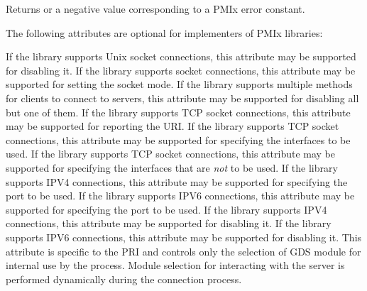 \begin{arglist}
\end{arglist}

Returns  or a negative value corresponding to a \ac{PMIx} error constant.

\optattrstart
The following attributes are optional for implementers of \ac{PMIx} libraries:

 If the library supports Unix socket connections, this attribute may be supported for disabling it.
\pasteAttributeItemEnd{}
 If the library supports socket connections, this attribute may be supported for setting the socket mode.
\pasteAttributeItemEnd{}
 If the library supports multiple methods for clients to connect to servers, this attribute may be supported for disabling all but one of them.
\pasteAttributeItemEnd{}
 If the library supports TCP socket connections, this attribute may be supported for reporting the URI.
\pasteAttributeItemEnd{}
 If the library supports TCP socket connections, this attribute may be supported for specifying the interfaces to be used.
\pasteAttributeItemEnd{}
 If the library supports TCP socket connections, this attribute may be supported for specifying the interfaces that are \textit{not} to be used.
\pasteAttributeItemEnd{}
 If the library supports IPV4 connections, this attribute may be supported for specifying the port to be used.
\pasteAttributeItemEnd{}
 If the library supports IPV6 connections, this attribute may be supported for specifying the port to be used.
\pasteAttributeItemEnd{}
 If the library supports IPV4 connections, this attribute may be supported for disabling it.
\pasteAttributeItemEnd{}
 If the library supports IPV6 connections, this attribute may be supported for disabling it.
\pasteAttributeItemEnd{}
 This attribute is specific to the \ac{PRI} and controls only the selection of \ac{GDS} module for internal use by the process. Module selection for interacting with the server is performed dynamically during the connection process.
\pastePRIAttributeItemEnd{}
\optattrend

